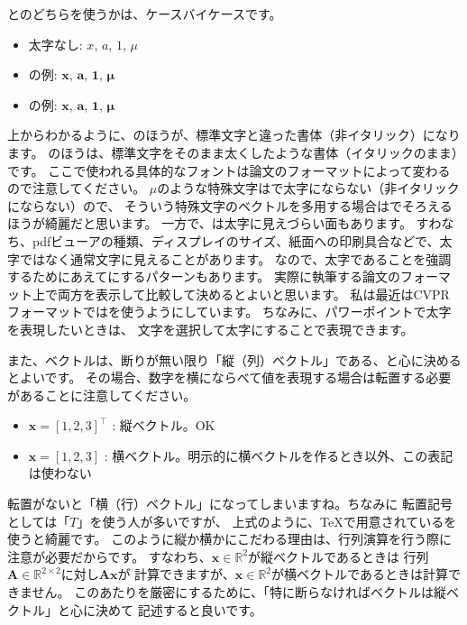 \documentclass[uplatex,twocolumn,9pt,dvipdfmx]{jsarticle}
\begin{document}
\texttt{\mathbf}と\texttt{\bm}のどちらを使うかは、ケースバイケースです。
\begin{itemize}
    \item 太字なし: $x$, $a$, $1$, $\mu$
    \item \texttt{\mathbf}の例: $\mathbf{x}$, $\mathbf{a}$, $\mathbf{1}$, $\mathbf{\mu}$
    \item \texttt{\bm}の例: $\bm{x}$, $\bm{a}$, $\bm{1}$, $\bm{\mu}$
\end{itemize}
上からわかるように、\texttt{\mathbf}のほうが、標準文字と違った書体（非イタリック）になります。
\texttt{\bm}のほうは、標準文字をそのまま太くしたような書体（イタリックのまま）です。
ここで使われる具体的なフォントは論文のフォーマットによって変わるので注意してください。
$\mu$のような特殊文字は\texttt{\mathbf}で太字にならない（非イタリックにならない）ので、
そういう特殊文字のベクトルを多用する場合は\texttt{\bm}でそろえるほうが綺麗だと思います。
一方で、\texttt{\bm}は太字に見えづらい面もあります。
すわなち、pdfビューアの種類、ディスプレイのサイズ、紙面への印刷具合などで、太字ではなく通常文字に見えることがあります。
なので、太字であることを強調するためにあえて\texttt{\mathbf}にするパターンもあります。
実際に執筆する論文のフォーマット上で両方を表示して比較して決めるとよいと思います。
私は最近はCVPRフォーマットでは\texttt{\mathbf}を使うようにしています。
ちなみに、パワーポイントで太字を表現したいときは、
文字を選択して太字にすることで表現できます。

また、ベクトルは、断りが無い限り「縦（列）ベクトル」である、と心に決めるとよいです。
その場合、数字を横にならべて値を表現する場合は転置する必要があることに注意してください。
\begin{itemize}
    \item $\mathbf{x} = [1, 2, 3]^\top$ : 縦ベクトル。OK
    \item $\mathbf{x} = [1, 2, 3]$ : 横ベクトル。明示的に横ベクトルを作るとき以外、この表記は使わない
\end{itemize}
転置がないと「横（行）ベクトル」になってしまいますね。ちなみに
転置記号としては「$T$」を使う人が多いですが、
上式のように、TeXで用意されている\texttt{\top}を使うと綺麗です。
このように縦か横かにこだわる理由は、行列演算を行う際に注意が必要だからです。
すなわち、$\mathbf{x} \in \mathbb{R}^2$が縦ベクトルであるときは
行列$\mathbf{A} \in \mathbb{R}^{2 \times 2}$に対し$\mathbf{A}\mathbf{x}$が
計算できますが、$\mathbf{x} \in \mathbb{R}^2$が横ベクトルであるときは計算できません。
このあたりを厳密にするために、「特に断らなければベクトルは縦ベクトル」と心に決めて
記述すると良いです。
\end{document}
